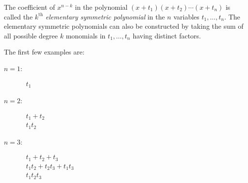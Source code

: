 \documentclass[12pt]{article}
\begin{document}
The coefficient of $x^{n-k}$ in the polynomial $(x+t_1) (x+t_2) \cdots (x+t_n)$ is called the $k^\mathrm{th}$ \emph{elementary symmetric polynomial} in the $n$ variables $t_1, \dots, t_n$. The elementary symmetric polynomials can also be constructed by taking the sum of all possible degree $k$ monomials in $t_1,\dots, t_n$ having distinct factors.

The first few examples are:
\begin{description}
\item[$n=1$:]
$
\begin{array}{l}
t_1
\end{array}
$
\item[$n=2$:]

$
\begin{array}{l}
 t_1 + t_2\\
 t_1 t_2
\end{array}
$
\item[$n=3$:]

$
\begin{array}{l}
 t_1 + t_2 + t_3\\
 t_1 t_2 + t_2 t_3 + t_1 t_3\\
 t_1 t_2 t_3
\end{array}
$
\end{description}
\end{document}
